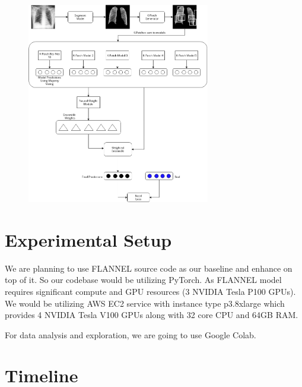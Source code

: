 \documentclass{sigkddExp}
\begin{document}
\begin{figure}[h]
    \includegraphics[width=8cm]{../doc/images/FLANNEL-IMPROVED.png}
\end{figure}


\section{Experimental Setup}

We are planning to use FLANNEL source code as our baseline and enhance
on top of it. So our codebase would be utilizing PyTorch. As FLANNEL
model requires significant compute and GPU resources (3 NVIDIA Tesla P100 GPUs).
We would be utilizing AWS EC2 service with instance type p3.8xlarge which
provides 4 NVIDIA Tesla V100 GPUs along with 32 core CPU and 64GB RAM.

For data analysis and exploration, we are going to use Google Colab.


\section{Timeline}
\end{document}
